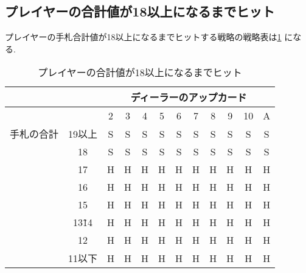 \subsection{プレイヤーの合計値が18以上になるまでヒット}
プレイヤーの手札合計値が18以上になるまでヒットする戦略の戦略表は\ref{hitleq18}
になる.
\begin{table}[htbp]
  \centering
  \caption{プレイヤーの合計値が18以上になるまでヒット\label{hitleq18}}
  \begin{tabular}{|c|c|c|c|c|c|c|c|c|c|c|c|}
    \hline
    \multicolumn{2}{|c|}{} & \multicolumn{10}{|c|}{ディーラーのアップカード} \\ \hline
    \multicolumn{2}{|c|}{} & 2 & 3 & 4 & 5 & 6 & 7 & 8 & 9 & 10 & A \\ \hline
    手札の合計 & 19以上 & S & S & S & S & S & S & S & S & S & S \\ \cline{3-12}
              & 18 & S & S & S & S & S & S & S & S & S & S \\ \cline{3-12}
              & 17 & H & H & H & H & H & H & H & H & H & H \\ \cline{3-12}
              & 16 & H & H & H & H & H & H & H & H & H & H \\ \cline{3-12}
              & 15 & H & H & H & H & H & H & H & H & H & H \\ \cline{3-12}
              & 13\~ 14 & H & H & H & H & H & H & H & H & H & H \\ \cline{3-12}
              & 12 & H & H & H & H & H & H & H & H & H & H \\ \cline{3-12}
              & 11以下 & H & H & H & H & H & H & H & H & H & H \\ \hline
  \end{tabular}
\end{table}